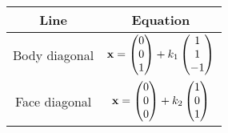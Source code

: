 \begin{tabular}{|c|c|}
\hline
Line & Equation \\
\hline
Body diagonal & $\mathbf{x} = \begin{pmatrix}0\\0\\1\end{pmatrix} + k_1\begin{pmatrix}1\\1\\-1\end{pmatrix}$ \\
\hline
Face diagonal & $\mathbf{x} = \begin{pmatrix}0\\0\\0\end{pmatrix} + k_2\begin{pmatrix}1\\0\\1\end{pmatrix}$ \\
\hline
\end{tabular}

